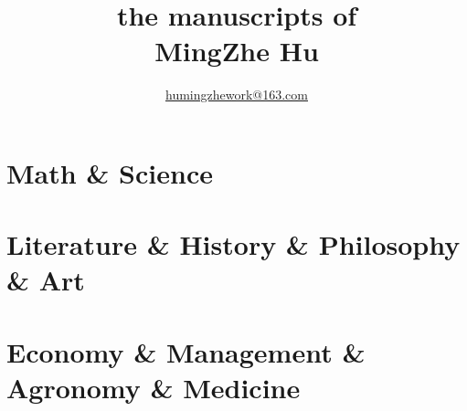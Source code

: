 \documentclass[a4paper]{article}
\title{the manuscripts of \\MingZhe Hu}
\author{\href{mailto: humingzhework@163.com}{humingzhework@163.com}}
\date{}
\begin{document}
\maketitle

\tableofcontents
\thispagestyle{empty}
\pagestyle{empty}
\newpage

\part{Math \& Science}
\newpage

\newpage

\newpage

\part{Literature \& History \& Philosophy \& Art}
\newpage

\newpage

\part{Economy \& Management \& Agronomy \& Medicine}
\newpage
\end{document}
